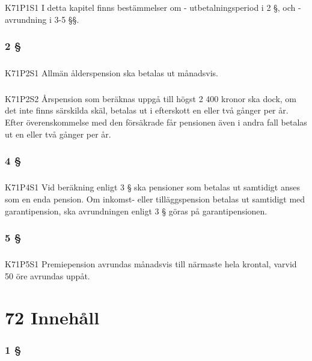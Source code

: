 \documentclass[a4paper,notitlepage,openany,10pt]{book}
\begin{document}
\paragraph*{}
{\tiny K71P1S1}
I detta kapitel finns bestämmelser om
\newline - utbetalningsperiod i 2 §, och
\newline - avrundning i 3-5 §§.
\subsection*{2 §}
\paragraph*{}
{\tiny K71P2S1}
Allmän ålderspension ska betalas ut månadsvis.
\paragraph*{}
{\tiny K71P2S2}
Årspension som beräknas uppgå till högst 2 400 kronor ska dock, om det inte finns särskilda skäl, betalas ut i efterskott en eller två gånger per år. Efter överenskommelse med den försäkrade får pensionen även i andra fall betalas ut en eller två gånger per år.
\subsection*{4 §}
\paragraph*{}
{\tiny K71P4S1}
Vid beräkning enligt 3 § ska pensioner som betalas ut samtidigt anses som en enda pension.
Om inkomst- eller tilläggspension betalas ut samtidigt med garantipension, ska avrundningen enligt 3 § göras på garantipensionen.
\subsection*{5 §}
\paragraph*{}
{\tiny K71P5S1}
Premiepension avrundas månadsvis till närmaste hela krontal, varvid 50 öre avrundas uppåt.
\chapter*{72 Innehåll}
\subsection*{1 §}
\end{document}

